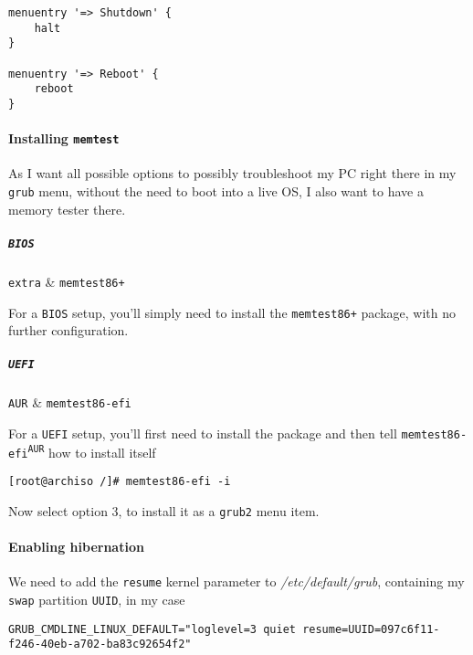 \documentclass[10pt]{dustdoc}
\begin{document}
\begin{verbatim}
menuentry '=> Shutdown' {
    halt
}

menuentry '=> Reboot' {
    reboot
}
\end{verbatim}

\paragraph{Installing \texttt{memtest}}
\label{par:installing-memtest}

As I want all possible options to possibly troubleshoot my PC right there in my \texttt{grub} menu,  without the need to boot into a live OS, I also want to have a memory tester there.

\subparagraph{\texttt{BIOS}}
\label{par:installing-memtest-bios}

\begin{packagetable}
    \texttt{extra} & \texttt{memtest86+} \\
\end{packagetable}

For a \texttt{BIOS} setup, you’ll simply need to install the \texttt{memtest86+} package, with no further configuration.

\subparagraph{\texttt{UEFI}}
\label{par:installing-memtest-uefi}

\begin{packagetable}
    \texttt{AUR} & \texttt{memtest86-efi} \\
\end{packagetable}

For a \texttt{UEFI} setup, you’ll first need to install the package and then tell \texttt{memtest86-efi\textsuperscript{\texttt{AUR}}} how to install itself

\begin{verbatim}
[root@archiso /]# memtest86-efi -i
\end{verbatim}

Now select option 3, to install it as a \texttt{grub2} menu item.

\paragraph{Enabling hibernation}
\label{par:enabling-hibernation}

We need to add the \texttt{resume} kernel parameter to \textit{/etc/default/grub}, containing my \texttt{swap} partition \texttt{UUID}, in my case

\begin{verbatim}
GRUB_CMDLINE_LINUX_DEFAULT="loglevel=3 quiet resume=UUID=097c6f11-f246-40eb-a702-ba83c92654f2"
\end{verbatim}
\end{document}
